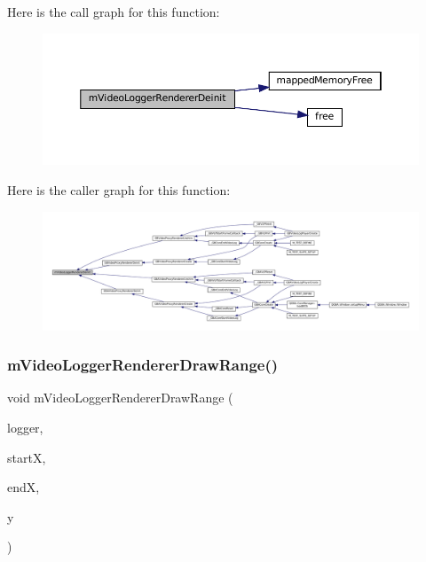 Here is the call graph for this function\+:
\nopagebreak
\begin{figure}[H]
\begin{center}
\leavevmode
\includegraphics[width=350pt]{video-logger_8c_ae525d818fd82d5753562673f85ff0b4d_cgraph}
\end{center}
\end{figure}
Here is the caller graph for this function\+:
\nopagebreak
\begin{figure}[H]
\begin{center}
\leavevmode
\includegraphics[width=350pt]{video-logger_8c_ae525d818fd82d5753562673f85ff0b4d_icgraph}
\end{center}
\end{figure}
\mbox{\label{video-logger_8c_a4ba6e2f71a9a753f746248d6b0855e7b}} 
\subsubsection{\texorpdfstring{m\+Video\+Logger\+Renderer\+Draw\+Range()}{mVideoLoggerRendererDrawRange()}}
{\footnotesize\ttfamily void m\+Video\+Logger\+Renderer\+Draw\+Range (\begin{DoxyParamCaption}\item[{struct m\+Video\+Logger $\ast$}]{logger,  }\item[{\mbox{\hyperlink{ioapi_8h_a787fa3cf048117ba7123753c1e74fcd6}{int}}}]{startX,  }\item[{\mbox{\hyperlink{ioapi_8h_a787fa3cf048117ba7123753c1e74fcd6}{int}}}]{endX,  }\item[{\mbox{\hyperlink{ioapi_8h_a787fa3cf048117ba7123753c1e74fcd6}{int}}}]{y }\end{DoxyParamCaption})}

